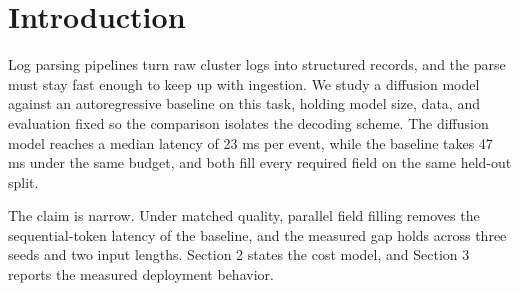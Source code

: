 \section{Introduction}

Log parsing pipelines turn raw cluster logs into structured records, and the
parse must stay fast enough to keep up with ingestion. We study a diffusion
model against an autoregressive baseline on this task, holding model size,
data, and evaluation fixed so the comparison isolates the decoding scheme.
The diffusion model reaches a median latency of 23 ms per event, while the
baseline takes 47 ms under the same budget, and both fill every required
field on the same held-out split.

The claim is narrow. Under matched quality, parallel field filling removes
the sequential-token latency of the baseline, and the measured gap holds
across three seeds and two input lengths. Section 2 states the cost model,
and Section 3 reports the measured deployment behavior.
